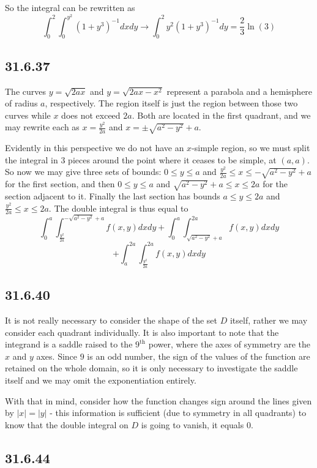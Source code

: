 \documentclass{article}
\begin{document}
So the integral can be rewritten as $$\int_0^2\int_0^{y^2}(1+y^3)^{-1}dxdy \to \int_0^2 y^2(1+y^3)^{-1} dy = \frac{2}{3}\ln(3)$$

\subsection{31.6.37}

The curves $y = \sqrt{2ax}$ and $y = \sqrt{2ax-x^{2}}$ represent a parabola and a hemisphere of radius $a$, respectively. The region itself is just the region between those two curves while $x$ does not exceed $2a$. Both are located in the first quadrant, and we may rewrite each as $x = \frac{y^2}{2a}$ and $x = \pm\sqrt{a^{2}-y^{2}}+a$. 

Evidently in this perspective we do not have an $x$-simple region, so we must split the integral in 3 pieces around the point where it ceases to be simple, at $(a,a)$. So now we may give three sets of bounds: $0 \leq y \leq a$ and $\frac{y^{2}}{2a} \leq x \leq -\sqrt{a^{2}-y^{2}} + a $ for the first section, and then $0 \leq y \leq a$ and $\sqrt{a^{2}-y^{2}}+a \leq x \leq 2a$ for the section adjacent to it. Finally the last section has bounds $a \leq y \leq 2a$ and $\frac{y^{2}}{2a} \leq x \leq 2a$. The double integral is thus equal to $$\int_{0}^{a}\int_{\frac{y^{2}}{2a}}^{-\sqrt{a^{2}-y^{2}} + a} f(x,y) dxdy + \int_{0}^{a}\int_{\sqrt{a^{2}-y^{2}}+a}^{2a} f(x,y) dxdy $$
$$+ \int_{a}^{2a}\int_{\frac{y^{2}}{2a}}^{2a} f(x,y) dxdy$$

\subsection{31.6.40}

It is not really necessary to consider the shape of the set $D$ itself, rather we may consider each quadrant individually. It is also important to note that the integrand is a saddle raised to the $9^{\text{th}}$ power, where the axes of symmetry are the $x$ and $y$ axes. Since $9$ is an odd number, the sign of the values of the function are retained on the whole domain, so it is only necessary to investigate the saddle itself and we may omit the exponentiation entirely.

With that in mind, consider how the function changes sign around the lines given by $|x| = |y|$ - this information is sufficient (due to symmetry in all quadrants) to know that the double integral on $D$ is going to vanish, it equals $0$. 

\subsection{31.6.44}
\end{document}
